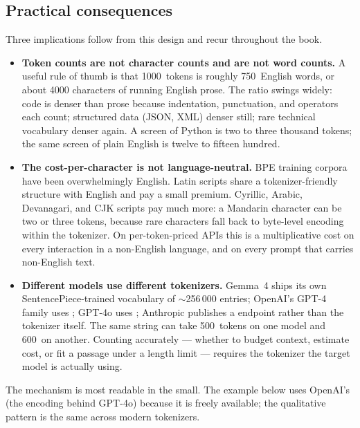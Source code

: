 \subsection{Practical consequences}
\label{sec:mental-tokens-consequences}

Three implications follow from this design and recur throughout
the book.

\begin{itemize}[leftmargin=1.5em,itemsep=0.4em]

\item \textbf{Token counts are not character counts and are not
  word counts.} A useful rule of thumb is that 1000~tokens is
  roughly 750~English words, or about 4000 characters of running
  English prose. The ratio swings widely: code is denser than
  prose because indentation, punctuation, and operators each
  count; structured data (JSON, XML) denser still; rare technical
  vocabulary denser again. A screen of Python is two to three
  thousand tokens; the same screen of plain English is twelve to
  fifteen hundred.

\item \textbf{The cost-per-character is not language-neutral.}
  BPE training corpora have been overwhelmingly English. Latin
  scripts share a tokenizer-friendly structure with English and
  pay a small premium. Cyrillic, Arabic, Devanagari, and CJK
  scripts pay much more: a Mandarin character can be two or three
  tokens, because rare characters fall back to byte-level encoding
  within the tokenizer. On per-token-priced APIs this is a
  multiplicative cost on every interaction in a non-English
  language, and on every prompt that carries non-English text.

\item \textbf{Different models use different tokenizers.} Gemma~4
  ships its own SentencePiece-trained vocabulary of
  $\sim$256\,000 entries; OpenAI's GPT-4 family uses
  ; GPT-4o uses ; Anthropic
  publishes a  endpoint rather than the
  tokenizer itself. The same string can take 500~tokens on one
  model and 600~on another. Counting accurately --- whether to
  budget context, estimate cost, or fit a passage under a length
  limit --- requires the tokenizer the target model is actually
  using.

\end{itemize}

\noindent
The mechanism is most readable in the small. The example below
uses OpenAI's  (the encoding behind GPT-4o)
because it is freely available; the qualitative pattern is the
same across modern tokenizers.

